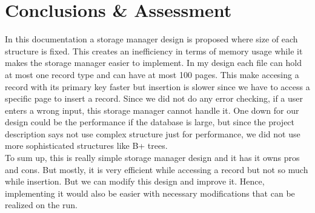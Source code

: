 \documentclass{article}
\newcounter{terms}
\begin{document}
\section{Conclusions \& Assessment}
    In this documentation a storage manager design is proposed where size of each
structure is fixed. This creates an inefficiency in terms of memory usage while
it makes the storage manager easier to implement.  In my design each file can hold at most one record type and can have at most 100 pages. This make accesing a record with its primary key faster but insertion is slower since we have to access a specific page to insert a record. Since we did not do any error checking, if a user enters a wrong input, this storage manager cannot handle it. One down for our design could be the performance if the database is large, but since the project description says not use complex structure just for performance, we did not use more sophisticated structures like B+ trees. \\
To sum up, this is really simple storage manager design and it has it owns pros and cons. But mostly, it is very efficient while accessing a record but not so much while insertion. But we can modify this design and improve it. Hence, implementing it would also be easier with necessary modifications that can be realized on the run.
\end{document}
